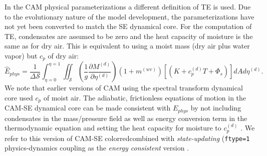 \documentclass[draft,linenumbers]{agujournal}
\newcommand*{\gi}[1]{\widehat{#1}}
\begin{document}
In the CAM physical parameterizations a different definition of TE is used. Due to the evolutionary nature of the model development, the parameterizations have not yet been converted to match the SE dynamical core. For the computation of TE, condensates are assumed to be zero and the heat capacity of moisture is the same as for dry air. This is equivalent to using a moist mass (dry air plus water vapor) but $c_p$ of dry air:
\begin{equation}
\label{eq:Ephys}
\gi{E}_{phys} =\frac{1}{\Delta \mathcal{S}}\int_{\eta=0}^{\eta=1} \iint_\mathcal{S} \left( \frac{1}{g}\frac{\partial M^{(d)}}{\partial \eta^{(d)}} \right)\left(1+m^{(wv)}\right)\left[ \left(K+c_p^{(d)}T+\Phi_s\right)\right]dA d \eta^{(d)}.
\end{equation}
We note that earlier versions of CAM using the spectral transform dynamical core used $c_p$ of moist air. The adiabatic, frictionless equations of motion in the CAM-SE dynamical core can be made consistent with $E_{phys}$ by not including condensates in the mass/pressure field as well as energy conversion term in the thermodynamic equation and setting the heat capacity for moisture to $c_p^{(d)}$ \citep{T2011LNCSEb}. We refer to this version of CAM-SE {color{red}{combined with {\em{state-updating}} ({\tt{ftype=1}} physics-dynamics coupling}} as the {\em{energy consistent}} version {\color{red}{; i.e. the same continuous formula for energy is used in both dynamics and physics, and there are no physics-dynamics coupling errors}}.
\end{document}
